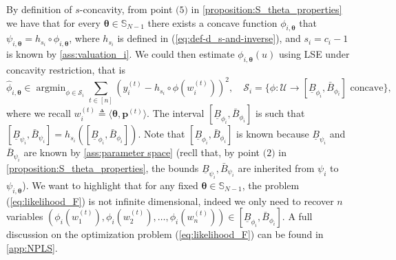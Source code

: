 \documentclass{article} %
\def\eqref#1{equation~\ref{#1}}
\renewcommand{\eqref}[1]{(\ref{#1})}
\begin{document}
By definition of $s$-concavity, from point $\textit{(5)}$ in \cref{proposition:S_theta_properties} we have that for every $\boldsymbol{\theta} \in \mathbb{S}_{N-1}$ there exists a concave function $\phi_{i,\boldsymbol{\theta}}$ that $\psi_{i,\boldsymbol{\theta}} = h_{s_i}\circ \phi_{i,\boldsymbol{\theta}}$, where $h_{s_i}$ is defined in \eqref{eq:def-d_s-and-inverse}, and $s_i=c_i-1$ is known by \cref{ass:valuation_i}. We could then estimate $\phi_{i,\boldsymbol{\theta}}(u)$ using LSE under concavity restriction, that is
\begin{equation}\label{eq:likelihood_F}
  \widehat{\phi}_{i,\boldsymbol{\theta}} \in  \operatorname{argmin}_{\phi \in \mathcal{S}_i} \sum_{t \in [n]} (y_i^{(t)}-h_{s_i} \circ \phi(w_i^{(t)}))^2, \quad \mathcal{S}_i =\{\phi: \mathcal{U}\rightarrow [\underline{B}_{\phi_i},\bar{B}_{\phi_i}] \text{ concave}\},
\end{equation}
where we recall $w^{(t)}_i \triangleq \langle\boldsymbol{\theta},\mathbf{p}^{(t)}\rangle$. The interval $[\underline{B}_{\phi_i},\bar{B}_{\phi_i}]$ is such that $[\underline{B}_{\psi_i},\bar{B}_{\psi_i}]=h_{s_i}([\underline{B}_{\phi_i},\bar{B}_{\phi_i}])$. Note that $[\underline{B}_{\phi_i},\bar{B}_{\phi_i}]$ is known because $\underline{B}_{\psi_i}$ and $\bar{B}_{\psi_i}$ are known by \cref{ass:parameter space} (recll that, by point $\textit{(2)}$ in \cref{proposition:S_theta_properties}, the bounds $\underline{B}_{\psi_i},\bar{B}_{\psi_i}$ are inherited from $\psi_i$ to $\psi_{i,\boldsymbol{\theta}}$). We want to highlight that for any fixed $\boldsymbol{\theta} \in \mathbb{S}_{N-1}$, the problem (\ref{eq:likelihood_F}) is not infinite dimensional, indeed we only need to recover $n$ variables $(\phi_i(w_1^{(t)}),\phi_i(w_2^{(t)}), \dots, \phi_i(w_n^{(t)})) \in [\underline{B}_{\phi_i},\bar{B}_{\phi_i}]$. A full discussion on the optimization problem (\ref{eq:likelihood_F}) can be found in \cref{app:NPLS}.
\end{document}
